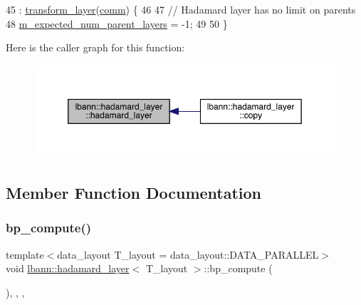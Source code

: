 \begin{DoxyCode}
45     : \hyperlink{classlbann_1_1transform__layer_a4b72501e0f4d0745c8b13c5331055e65}{transform\_layer}(\hyperlink{file__io_8cpp_ab048c6f9fcbcfaa57ce68b00263dbebe}{comm}) \{
46 
47     \textcolor{comment}{// Hadamard layer has no limit on parents}
48     \hyperlink{classlbann_1_1Layer_a841b96b25555247f52921c7f13ae1dfa}{m\_expected\_num\_parent\_layers} = -1;
49 
50   \}
\end{DoxyCode}
Here is the caller graph for this function\+:\nopagebreak
\begin{figure}[H]
\begin{center}
\leavevmode
\includegraphics[width=350pt]{classlbann_1_1hadamard__layer_af79b4f3d1e2709092b36fb0f38d30430_icgraph}
\end{center}
\end{figure}


\subsection{Member Function Documentation}
\mbox{\label{classlbann_1_1hadamard__layer_a2150c54cc21fb5dc51d77119c20c6c21}} 
\subsubsection{\texorpdfstring{bp\+\_\+compute()}{bp\_compute()}}
{\footnotesize\ttfamily template$<$data\+\_\+layout T\+\_\+layout = data\+\_\+layout\+::\+D\+A\+T\+A\+\_\+\+P\+A\+R\+A\+L\+L\+EL$>$ \\
void \hyperlink{classlbann_1_1hadamard__layer}{lbann\+::hadamard\+\_\+layer}$<$ T\+\_\+layout $>$\+::bp\+\_\+compute (\begin{DoxyParamCaption}{ }\end{DoxyParamCaption})\hspace{0.3cm}{\ttfamily [inline]}, {\ttfamily [override]}, {\ttfamily [protected]}, {\ttfamily [virtual]}}

